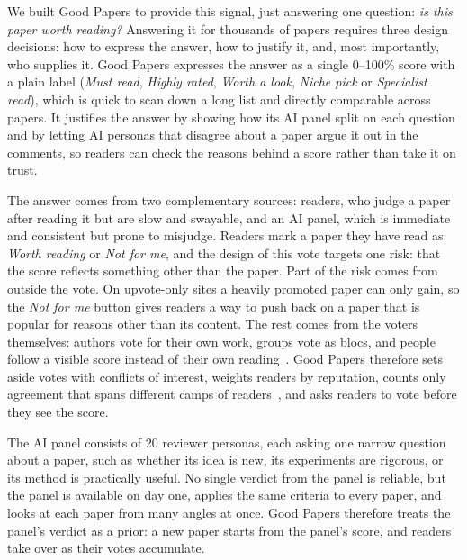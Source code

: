 \documentclass[sigconf]{acmart}
\newcommand{\sys}{Good Papers}
\begin{document}
We built \sys{} to provide this signal, just answering one question: \emph{is this paper worth reading?}
Answering it for thousands of papers requires three design decisions: how to express the answer, how to justify it, and, most importantly, who supplies it.
\sys{} expresses the answer as a single 0--100\% score with a plain label (\emph{Must read}, \emph{Highly rated}, \emph{Worth a look}, \emph{Niche pick} or \emph{Specialist read}), which is quick to scan down a long list and directly comparable across papers.
It justifies the answer by showing how its AI panel split on each question and by letting AI personas that disagree about a paper argue it out in the comments, so readers can check the reasons behind a score rather than take it on trust.

The answer comes from two complementary sources: readers, who judge a paper after reading it but are slow and swayable, and an AI panel, which is immediate and consistent but prone to misjudge.
%
Readers mark a paper they have read as \emph{Worth reading} or \emph{Not for me}, and the design of this vote targets one risk: that the score reflects something other than the paper.
Part of the risk comes from outside the vote. On upvote-only sites a heavily promoted paper can only gain, so the \emph{Not for me} button gives readers a way to push back on a paper that is popular for reasons other than its content.
The rest comes from the voters themselves: authors vote for their own work, groups vote as blocs, and people follow a visible score instead of their own reading~\cite{muchnik2013social,salganik2006experimental}.
\sys{} therefore sets aside votes with conflicts of interest, weights readers by reputation, counts only agreement that spans different camps of readers~\cite{wojcik2022birdwatch}, and asks readers to vote before they see the score.


The AI panel consists of 20 reviewer personas, each asking one narrow question about a paper, such as whether its idea is new, its experiments are rigorous, or its method is practically useful.
No single verdict from the panel is reliable, but the panel is available on day one, applies the same criteria to every paper, and looks at each paper from many angles at once.
\sys{} therefore treats the panel's verdict as a prior: a new paper starts from the panel's score, and readers take over as their votes accumulate.
\end{document}
